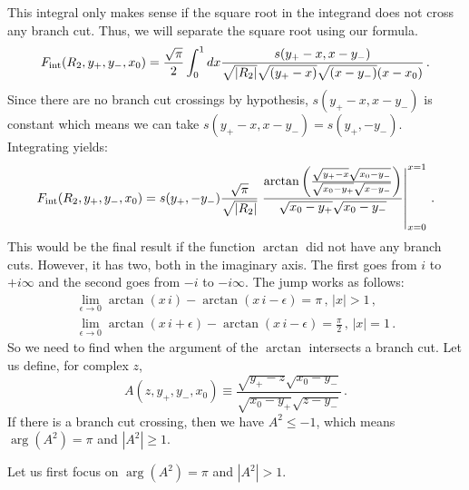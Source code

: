 \documentclass[twoside]{article}
\begin{document}
This integral only makes sense if the square root in the integrand does not cross any branch cut. Thus, we will separate the square root using our formula.
\begin{equation}
\label{eq:Fint2}
F_{\rm int}(R_2, y_+, y_-, x_0) = \frac{\sqrt{\pi}}{2} \int_0^1 dx \frac{s(y_+-x,x-y_-)}{\sqrt{|R_2|}\sqrt{(y_+ - x)}\sqrt{(x - y_-)}(x-x_0)}\,.
\end{equation}
Since there are no branch cut crossings by hypothesis,  $s(y_+-x,x-y_-)$ is constant which means we can take $s(y_+-x,x-y_-) = s(y_+,-y_-)$.
Integrating yields:
\begin{equation}
\label{eq:Fintexpr}
F_{\rm int}(R_2, y_+, y_-, x_0) = s(y_+,-y_-)\frac{\sqrt{\pi} }{\sqrt{|R_2|}} \left.\frac{\arctan\left(\frac{\sqrt{y_+-x}\sqrt{x_0 - y_-}}{\sqrt{x_0-y_+}\sqrt{x-y_-}}\right)}{\sqrt{x_0 - y_+}\sqrt{x_0 - y_-}}\right|_{x=0}^{x=1}\,.
\end{equation}
This would be the final result if the function $\arctan$ did not have any branch cuts. However, it has two, both in the imaginary axis. The first goes from $i$ to $+ i \infty$ and the second goes from $-i$ to $- i \infty$. The jump works as follows:
\begin{equation}
\begin{split}
\lim_{\epsilon\to 0} \arctan(x\, i ) -\arctan(x\, i - \epsilon) = \pi\,, \, |x|>1\,,\\
\lim_{\epsilon\to 0} \arctan(x\, i +\epsilon) -\arctan(x\, i - \epsilon) = \frac{\pi}{2}\,, \, |x|=1\,.
\end{split}
\end{equation}
So we need to find when the argument of the $\arctan$ intersects a branch cut.
Let us define, for complex $z$,
\begin{equation}
A(z, y_+, y_-, x_0) \equiv \frac{\sqrt{y_+-z}\sqrt{x_0 - y_-}}{\sqrt{x_0-y_+}\sqrt{z-y_-}}\,.
\end{equation}
If there is a branch cut crossing, then we have
$A^2 \leq -1$, which means $\arg(A^2) = \pi$ and $|A^2| \geq 1$.

Let us first focus on $\arg(A^2) = \pi$ and $|A^2| > 1$.
\end{document}

